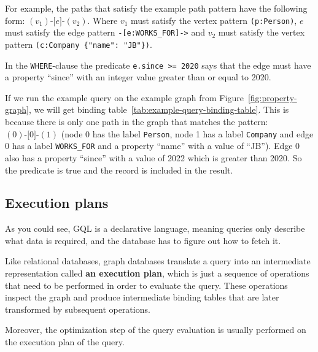 \documentclass[14pt]{constructor-thesis}
\theoremstyle{definition}
\newcommand{\pathstart}[1]{(#1)}
\newcommand{\pathhop}[3]{#1 \texttt{-[} #2 \texttt{]-} (#3)}
\begin{document}
For example, the paths that satisfy the example path pattern have the following form: $\pathhop{\pathstart{v_1}}{e}{v_2}$. Where $v_1$ must satisfy the vertex pattern \verb+(p:Person)+, $e$ must satisfy the edge pattern \verb+-[e:WORKS_FOR]->+ and $v_2$ must satisfy the vertex pattern \verb+(c:Company {"name": "JB"})+.

In the \texttt{WHERE}-clause the predicate \verb+e.since >= 2020+ says that the edge must have a property ``since'' with an integer value greater than or equal to 2020.


If we run the example query on the example graph from Figure~\ref{fig:property-graph}, we will get binding table~\ref{tab:example-query-binding-table}. This is because there is only one path in the graph that matches the pattern: $\pathhop{\pathstart{0}}{0}{1}$ (node 0 has the label \texttt{Person}, node 1 has a label \texttt{Company} and edge 0 has a label \texttt{WORKS\_FOR} and a property ``name'' with a value of ``JB''). Edge 0 also has a property ``since'' with a value of 2022 which is greater than 2020. So the predicate is true and the record is included in the result.

\subsection{Execution plans}

As you could see, GQL is a declarative language, meaning queries only describe what data is required, and the database has to figure out how to fetch it.

Like relational databases, graph databases translate a query into an intermediate representation called \textbf{an execution plan}, which is just a sequence of operations that need to be performed in order to evaluate the query. These operations inspect the graph and produce intermediate binding tables that are later transformed by subsequent operations.

Moreover, the optimization step of the query evaluation is usually performed on the execution plan of the query.
\end{document}
